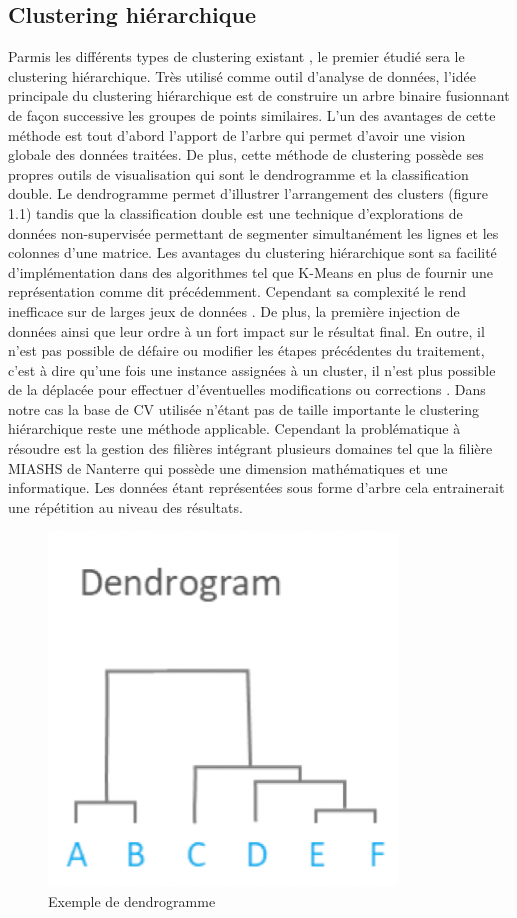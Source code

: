 \documentclass[memoire.tex]{subfiles}
\begin{document}
		\subsection{Clustering hiérarchique}
Parmis les différents types de clustering existant \cite{ref4}, le premier étudié sera le clustering hiérarchique. Très utilisé comme outil d'analyse de données, l'idée principale du clustering hiérarchique est de construire un arbre binaire fusionnant de façon successive les groupes de points similaires. L'un des avantages de cette méthode est tout d'abord l'apport de l'arbre qui permet d'avoir une vision globale des données traitées. De plus, cette méthode de clustering possède ses propres outils de visualisation qui sont le dendrogramme et la classification double. Le dendrogramme permet d'illustrer l'arrangement des clusters (figure 1.1)  tandis que la classification double est une technique d'explorations de données non-supervisée permettant de segmenter simultanément les lignes et les colonnes d'une matrice. Les avantages du clustering hiérarchique sont sa facilité d'implémentation dans des algorithmes tel que K-Means en plus de fournir une représentation comme dit précédemment. Cependant sa complexité le rend inefficace sur de larges jeux de données \cite{ref7}. De plus, la première injection de données ainsi que leur  ordre à un fort impact sur le résultat final. En outre, il n'est pas possible de défaire ou modifier les étapes précédentes du traitement, c'est à dire qu'une fois une instance assignées à un cluster, il n'est plus possible de la déplacée pour effectuer d'éventuelles modifications ou corrections \cite{ref5}. Dans notre cas la base de CV utilisée n'étant pas de taille importante le clustering hiérarchique reste une méthode applicable. Cependant la problématique à résoudre est la gestion des filières intégrant plusieurs domaines tel que la filière MIASHS de Nanterre qui possède une dimension mathématiques et une informatique. Les données étant représentées sous forme d'arbre cela entrainerait une répétition au niveau des résultats.
	\begin{figure}
		\includegraphics[scale=0.8]{img/hierarchical_clustering.png}
		\caption{Exemple de dendrogramme}
	\end{figure}
	
\end{document}
